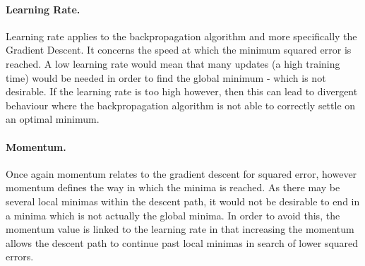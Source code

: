 \documentclass[12pt]{article}
\begin{document}
        \paragraph{Learning Rate.}
          Learning rate applies to the backpropagation algorithm and more specifically the Gradient Descent. It concerns the speed at which the minimum squared error is reached. A low learning rate would mean that many updates (a high training time) would be needed in order to find the global minimum - which is not desirable. If the learning rate is too high however, then this can lead to divergent behaviour where the backpropagation algorithm is not able to correctly settle on an optimal minimum.



        \paragraph{Momentum.}
          Once again momentum relates to the gradient descent for squared error, however momentum defines the way in which the minima is reached. As there may be several local minimas within the descent path, it would not be desirable to end in a minima which is not actually the global minima. In order to avoid this, the momentum value is linked to the learning rate in that increasing the momentum allows the descent path to continue past local minimas in search of lower squared errors.
\end{document}
